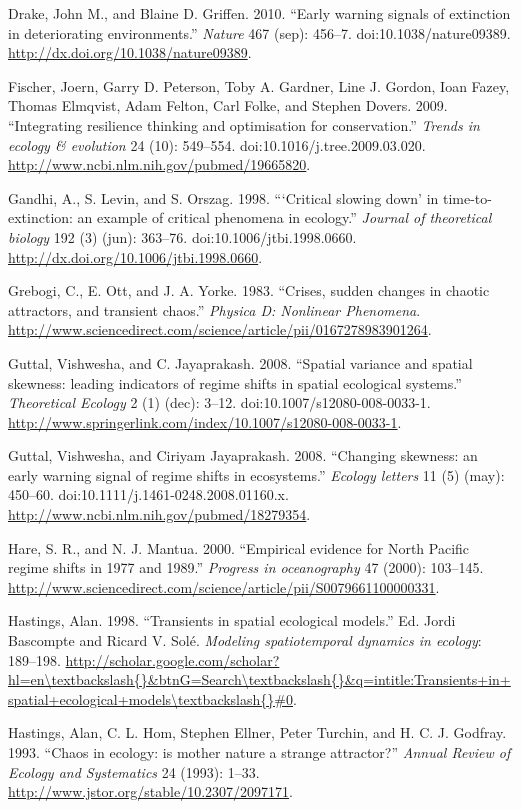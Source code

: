\documentclass[author-year, review]{elsarticle} %
\begin{document}
Drake, John M., and Blaine D. Griffen. 2010. ``Early warning signals of
extinction in deteriorating environments.'' \emph{Nature} 467 (sep):
456--7. doi:10.1038/nature09389.
\url{http://dx.doi.org/10.1038/nature09389}.

Fischer, Joern, Garry D. Peterson, Toby A. Gardner, Line J. Gordon, Ioan
Fazey, Thomas Elmqvist, Adam Felton, Carl Folke, and Stephen Dovers.
2009. ``Integrating resilience thinking and optimisation for
conservation.'' \emph{Trends in ecology \& evolution} 24 (10): 549--554.
doi:10.1016/j.tree.2009.03.020.
\url{http://www.ncbi.nlm.nih.gov/pubmed/19665820}.

Gandhi, A., S. Levin, and S. Orszag. 1998. ```Critical slowing down' in
time-to-extinction: an example of critical phenomena in ecology.''
\emph{Journal of theoretical biology} 192 (3) (jun): 363--76.
doi:10.1006/jtbi.1998.0660.
\url{http://dx.doi.org/10.1006/jtbi.1998.0660}.

Grebogi, C., E. Ott, and J. A. Yorke. 1983. ``Crises, sudden changes in
chaotic attractors, and transient chaos.'' \emph{Physica D: Nonlinear
Phenomena}.
\url{http://www.sciencedirect.com/science/article/pii/0167278983901264}.

Guttal, Vishwesha, and C. Jayaprakash. 2008. ``Spatial variance and
spatial skewness: leading indicators of regime shifts in spatial
ecological systems.'' \emph{Theoretical Ecology} 2 (1) (dec): 3--12.
doi:10.1007/s12080-008-0033-1.
\url{http://www.springerlink.com/index/10.1007/s12080-008-0033-1}.

Guttal, Vishwesha, and Ciriyam Jayaprakash. 2008. ``Changing skewness:
an early warning signal of regime shifts in ecosystems.'' \emph{Ecology
letters} 11 (5) (may): 450--60. doi:10.1111/j.1461-0248.2008.01160.x.
\url{http://www.ncbi.nlm.nih.gov/pubmed/18279354}.

Hare, S. R., and N. J. Mantua. 2000. ``Empirical evidence for North
Pacific regime shifts in 1977 and 1989.'' \emph{Progress in
oceanography} 47 (2000): 103--145.
\url{http://www.sciencedirect.com/science/article/pii/S0079661100000331}.

Hastings, Alan. 1998. ``Transients in spatial ecological models.'' Ed.
Jordi Bascompte and Ricard V. Solé. \emph{Modeling spatiotemporal
dynamics in ecology}: 189--198.
\url{http://scholar.google.com/scholar?hl=en\textbackslash{}\&btnG=Search\textbackslash{}\&q=intitle:Transients+in+spatial+ecological+models\textbackslash{}\#0}.

Hastings, Alan, C. L. Hom, Stephen Ellner, Peter Turchin, and H. C. J.
Godfray. 1993. ``Chaos in ecology: is mother nature a strange
attractor?'' \emph{Annual Review of Ecology and Systematics} 24 (1993):
1--33. \url{http://www.jstor.org/stable/10.2307/2097171}.
\end{document}
